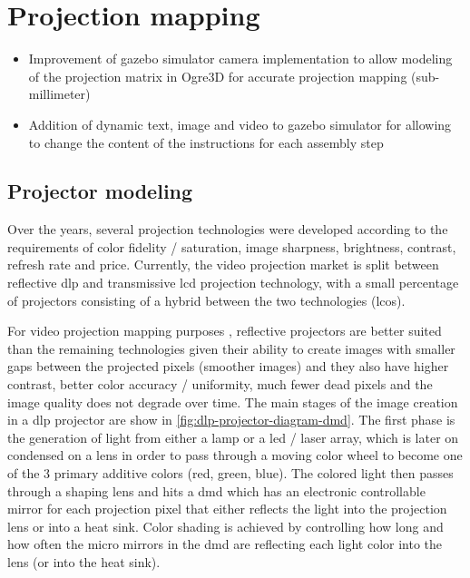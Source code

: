 \section{Projection mapping}

\begin{itemize}
	\item Improvement of gazebo simulator camera implementation to allow modeling of the projection matrix in Ogre3D for accurate projection mapping (sub-millimeter)
	\item Addition of dynamic text, image and video to gazebo simulator for allowing to change the content of the instructions for each assembly step
\end{itemize}


\subsection{Projector modeling}

Over the years, several projection technologies were developed according to the requirements of color fidelity / saturation, image sharpness, brightness, contrast, refresh rate and price. Currently, the video projection market is split between reflective \gls{dlp} and transmissive \gls{lcd} projection technology, with a small percentage of projectors consisting of a hybrid between the two technologies (\gls{lcos}).

For video projection mapping purposes \cite{Raskar1998,Bimber2005,Tan2013,Fujimoto2014}, reflective projectors are better suited than the remaining technologies given their ability to create images with smaller gaps between the projected pixels (smoother images) and they also have higher contrast, better color accuracy / uniformity, much fewer dead pixels and the image quality does not degrade over time. The main stages of the image creation in a \gls{dlp} projector are show in \cref{fig:dlp-projector-diagram-dmd}. The first phase is the generation of light from either a lamp or a \gls{led} / laser array, which is later on condensed on a lens in order to pass through a moving color wheel to become one of the 3 primary additive colors (red, green, blue). The colored light then passes through a shaping lens and hits a \gls{dmd} which has an electronic controllable mirror for each projection pixel that either reflects the light into the projection lens or into a heat sink. Color shading is achieved by controlling how long and how often the micro mirrors in the \gls{dmd} are reflecting each light color into the lens (or into the heat sink).


